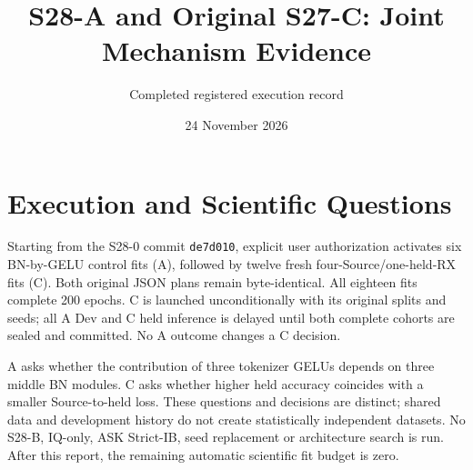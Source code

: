 \documentclass[10pt]{article}
\title{S28-A and Original S27-C: Joint Mechanism Evidence}
\author{Completed registered execution record}\date{24 November 2026}
\begin{document}
\maketitle
\section{Execution and Scientific Questions}
Starting from the S28-0 commit \texttt{de7d010}, explicit user authorization activates six BN-by-GELU control fits (A), followed by twelve fresh four-Source/one-held-RX fits (C). Both original JSON plans remain byte-identical. All eighteen fits complete 200 epochs. C is launched unconditionally with its original splits and seeds; all A Dev and C held inference is delayed until both complete cohorts are sealed and committed. No A outcome changes a C decision.

A asks whether the contribution of three tokenizer GELUs depends on three middle BN modules. C asks whether higher held accuracy coincides with a smaller Source-to-held loss. These questions and decisions are distinct; shared data and development history do not create statistically independent datasets. No S28-B, IQ-only, ASK Strict-IB, seed replacement or architecture search is run. After this report, the remaining automatic scientific fit budget is zero.
\end{document}
